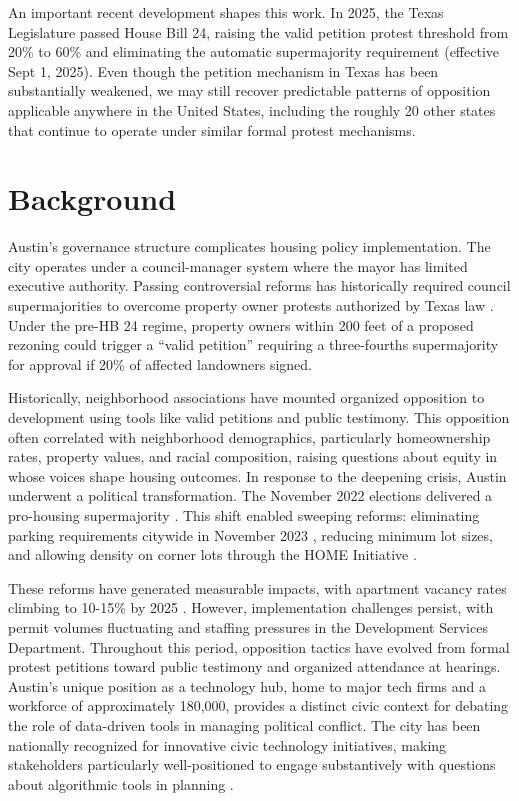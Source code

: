 \documentclass[12pt]{article}
\begin{document}
An important recent development shapes this work. In 2025, the Texas Legislature passed House Bill 24, raising the valid petition protest threshold from 20\% to 60\% and eliminating the automatic supermajority requirement (effective Sept 1, 2025). Even though the petition mechanism in Texas has been substantially weakened, we may still recover predictable patterns of opposition applicable anywhere in the United States, including the roughly 20 other states that continue to operate under similar formal protest mechanisms.

\section{Background}

Austin's governance structure complicates housing policy implementation. The city operates under a council-manager system where the mayor has limited executive authority. Passing controversial reforms has historically required council supermajorities to overcome property owner protests authorized by Texas law \autocite{cityaustin2010}. Under the pre-HB 24 regime, property owners within 200 feet of a proposed rezoning could trigger a ``valid petition'' requiring a three-fourths supermajority for approval if 20\% of affected landowners signed.

Historically, neighborhood associations have mounted organized opposition to development using tools like valid petitions and public testimony. This opposition often correlated with neighborhood demographics, particularly homeownership rates, property values, and racial composition, raising questions about equity in whose voices shape housing outcomes. In response to the deepening crisis, Austin underwent a political transformation. The November 2022 elections delivered a pro-housing supermajority \autocite{tcclerk2022}. This shift enabled sweeping reforms: eliminating parking requirements citywide in November 2023 \autocite{axios2023parking}, reducing minimum lot sizes, and allowing density on corner lots through the HOME Initiative \autocite{pool2023}.

These reforms have generated measurable impacts, with apartment vacancy rates climbing to 10-15\% by 2025 \autocite{kvue2024vacancy}. However, implementation challenges persist, with permit volumes fluctuating and staffing pressures in the Development Services Department. Throughout this period, opposition tactics have evolved from formal protest petitions toward public testimony and organized attendance at hearings. Austin's unique position as a technology hub, home to major tech firms and a workforce of approximately 180,000, provides a distinct civic context for debating the role of data-driven tools in managing political conflict. The city has been nationally recognized for innovative civic technology initiatives, making stakeholders particularly well-positioned to engage substantively with questions about algorithmic tools in planning \autocite{efa2025,idc2024}.
\end{document}
